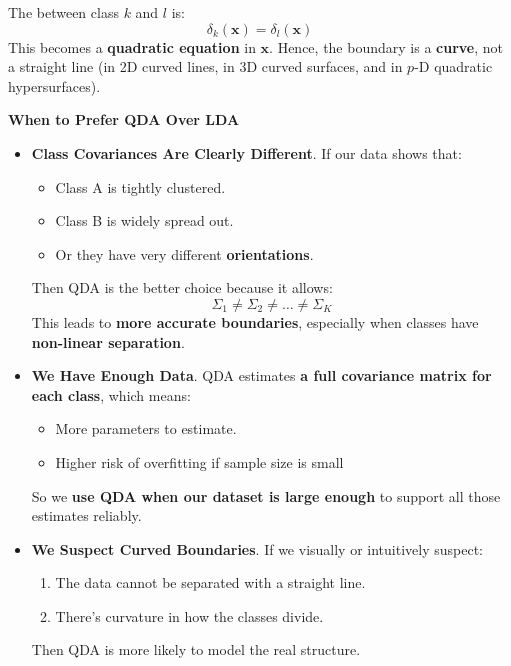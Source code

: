 \highspace
The  between class $k$ and $l$ is:
\begin{equation*}
    \delta_{k}\left(\mathbf{x}\right) = \delta_{l}\left(\mathbf{x}\right)
\end{equation*}
This becomes a \textbf{quadratic equation} in $\mathbf{x}$. Hence, the boundary is a \textbf{curve}, not a straight line (in 2D curved lines, in 3D curved surfaces, and in $p$-D quadratic hypersurfaces).

\newpage

\begin{flushleft}
    \textcolor{Green3}{ \textbf{When to Prefer QDA Over LDA}}
\end{flushleft}
\begin{itemize}[label=\textcolor{Green3}{}]
    \item \textcolor{Green3}{\textbf{Class Covariances Are Clearly Different}}. If our data shows that:
    \begin{itemize}
        \item Class A is tightly clustered.
        \item Class B is widely spread out.
        \item Or they have very different \textbf{orientations}.
    \end{itemize}
    Then QDA is the better choice because it allows:
    \begin{equation*}
        \Sigma_1 \neq \Sigma_2 \neq \dots \neq \Sigma_K
    \end{equation*}
    This leads to \textbf{more accurate boundaries}, especially when classes have \textbf{non-linear separation}.

    \item \textcolor{Green3}{\textbf{We Have Enough Data}}. QDA estimates \textbf{a full covariance matrix for each class}, which means:
    \begin{itemize}
        \item More parameters to estimate.
        \item Higher risk of overfitting if sample size is small
    \end{itemize}
    So we \textbf{use QDA when our dataset is large enough} to support all those estimates reliably. 

    \item \textcolor{Green3}{\textbf{We Suspect Curved Boundaries}}. If we visually or intuitively suspect:
    \begin{enumerate}
        \item The data cannot be separated with a straight line.
        \item There's curvature in how the classes divide.
    \end{enumerate}
    Then QDA is more likely to model the real structure.
\end{itemize}

